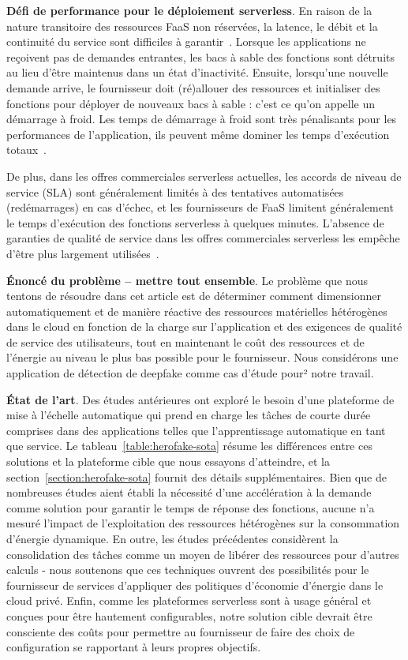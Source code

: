 \textbf{Défi de performance pour le déploiement serverless}. En raison de la nature transitoire des ressources FaaS non réservées, la latence, le débit et la continuité du service sont difficiles à garantir~\cite{vaneykSPECRGCloud2018, dartoisCuckooOpportunisticMapReduce2019}. Lorsque les applications ne reçoivent pas de demandes entrantes, les bacs à sable des fonctions sont détruits au lieu d'être maintenus dans un état d'inactivité. Ensuite, lorsqu'une nouvelle demande arrive, le fournisseur doit (ré)allouer des ressources et initialiser des fonctions pour déployer de nouveaux bacs à sable : c'est ce qu'on appelle un démarrage à froid. Les temps de démarrage à froid sont très pénalisants pour les performances de l'application, ils peuvent même dominer les temps d'exécution totaux~\cite{mullerLambadaInteractiveData2020}.

De plus, dans les offres commerciales serverless actuelles, les accords de niveau de service (SLA) sont généralement limités à des tentatives automatisées (redémarrages) en cas d'échec, et les fournisseurs de FaaS limitent généralement le temps d'exécution des fonctions serverless à quelques minutes. L'absence de garanties de qualité de service dans les offres commerciales serverless les empêche d'être plus largement utilisées~\cite{buyyaSLAorientedResourceProvisioning2011}.

\textbf{Énoncé du problème -- mettre tout ensemble}. Le problème que nous tentons de résoudre dans cet article est de déterminer comment dimensionner automatiquement et de manière réactive des ressources matérielles hétérogènes dans le cloud en fonction de la charge sur l'application et des exigences de qualité de service des utilisateurs, tout en maintenant le coût des ressources et de l'énergie au niveau le plus bas possible pour le fournisseur. Nous considérons une application de détection de deepfake comme cas d'étude pour² notre travail.

\textbf{État de l'art}. Des études antérieures ont exploré le besoin d'une plateforme de mise à l'échelle automatique qui prend en charge les tâches de courte durée comprises dans des applications telles que l'apprentissage automatique en tant que service. Le tableau~\ref{table:herofake-sota} résume les différences entre ces solutions et la plateforme cible que nous essayons d'atteindre, et la section~\ref{section:herofake-sota} fournit des détails supplémentaires. Bien que de nombreuses études aient établi la nécessité d'une accélération à la demande comme solution pour garantir le temps de réponse des fonctions, aucune n'a mesuré l'impact de l'exploitation des ressources hétérogènes sur la consommation d'énergie dynamique. En outre, les études précédentes considèrent la consolidation des tâches comme un moyen de libérer des ressources pour d'autres calculs - nous soutenons que ces techniques ouvrent des possibilités pour le fournisseur de services d'appliquer des politiques d'économie d'énergie dans le cloud privé. Enfin, comme les plateformes serverless sont à usage général et conçues pour être hautement configurables, notre solution cible devrait être consciente des coûts pour permettre au fournisseur de faire des choix de configuration se rapportant à leurs propres objectifs.

